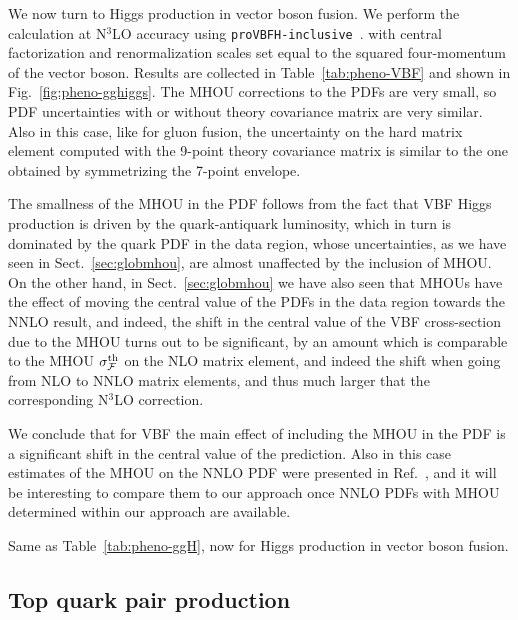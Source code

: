 We now turn  to Higgs production in vector boson fusion.
We perform the calculation at N$^3$LO accuracy
using {\tt proVBFH-inclusive}~\cite{Cacciari:2015jma,Dreyer:2016oyx}.
with central factorization and renormalization scales set equal
to the squared four-momentum of the vector boson. 
% 
Results are collected in Table~\ref{tab:pheno-VBF} and shown
in Fig.~\ref{fig:pheno-gghiggs}.  
The  MHOU corrections to the PDFs are very small, so 
PDF uncertainties with or without theory covariance matrix are very similar.
Also in this case, like for gluon fusion, the uncertainty on the hard
matrix element computed with the
9-point theory covariance matrix
is similar to the one obtained by symmetrizing the 7-point envelope. 

The smallness of the MHOU in the PDF follows from the fact that VBF 
Higgs production
is driven by the quark-antiquark luminosity, which in turn is
dominated by the quark PDF in the data region, whose uncertainties,
as we have seen
in Sect.~\ref{sec:globmhou}, are almost unaffected by the inclusion of
MHOU.
On the other hand, in Sect.~\ref{sec:globmhou} we have also seen that
MHOUs have the effect of moving the central value of the PDFs in the data
region towards the NNLO result, and indeed,
the shift in the central value of the VBF cross-section
due to the MHOU turns out to be significant, by an amount which is
comparable to the MHOU $\sigma_{\mathcal{F}}^{\rm th}$ on the
NLO matrix element, and indeed the shift when going from NLO to 
NNLO matrix elements, and thus much larger that the corresponding 
N$^3$LO correction.

We conclude that for VBF the main effect of including the MHOU in the PDF 
is a significant shift in the central value of the prediction. Also in this case
estimates of the MHOU on the NNLO PDF were presented in
Ref.~\cite{Dreyer:2016oyx}, and it will be interesting to compare them
to our approach once NNLO PDFs with MHOU determined within our
approach are available.
%

\begin{table}[t]
	\centering
	\small
	
        \vspace*{3mm}
	\caption{Same as Table~\ref{tab:pheno-ggH}, now for Higgs production in vector boson fusion.}
	\label{tab:pheno-VBF}
\end{table}

\subsection{Top quark pair production}
\label{sec:top}

